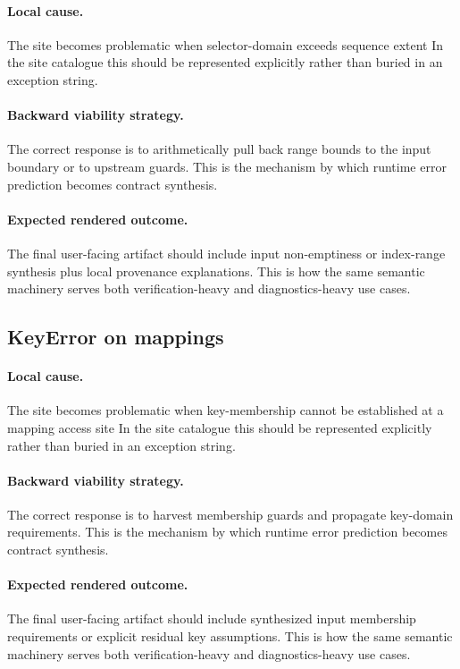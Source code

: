 \documentclass[11pt]{report}
\theoremstyle{definition}
\theoremstyle{plain}
\begin{document}
\paragraph{Local cause.}
The site becomes problematic when selector-domain exceeds sequence extent In the site catalogue this should be
represented explicitly rather than buried in an exception string.

\paragraph{Backward viability strategy.}
The correct response is to arithmetically pull back range bounds to the input boundary or to upstream guards. This is the mechanism by which runtime
error prediction becomes contract synthesis.

\paragraph{Expected rendered outcome.}
The final user-facing artifact should include input non-emptiness or index-range synthesis plus local provenance explanations. This is how the same
semantic machinery serves both verification-heavy and diagnostics-heavy use
cases.

\subsection{KeyError on mappings}

\paragraph{Local cause.}
The site becomes problematic when key-membership cannot be established at a mapping access site In the site catalogue this should be
represented explicitly rather than buried in an exception string.

\paragraph{Backward viability strategy.}
The correct response is to harvest membership guards and propagate key-domain requirements. This is the mechanism by which runtime
error prediction becomes contract synthesis.

\paragraph{Expected rendered outcome.}
The final user-facing artifact should include synthesized input membership requirements or explicit residual key assumptions. This is how the same
semantic machinery serves both verification-heavy and diagnostics-heavy use
cases.
\end{document}
